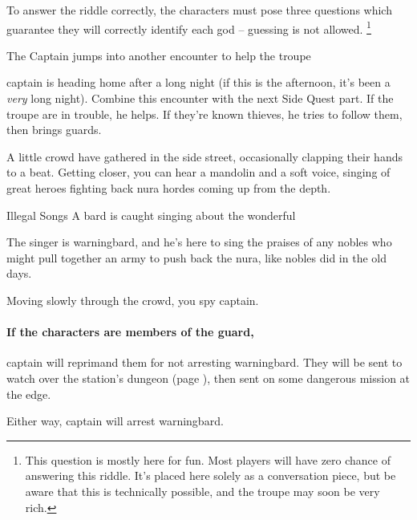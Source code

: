 To answer the riddle correctly, the characters must pose three questions which guarantee they will correctly identify each god -- guessing is not allowed.
\footnote{This question is mostly here for fun.  Most players will have zero chance of answering this riddle.
It's placed here solely as a conversation piece, but be aware that this is technically possible, and the troupe may soon be very rich.}

{\squash The Captain}%
{ jumps into another encounter to help the troupe}%

\Gls{captain} is heading home after a long night (if this is the afternoon, it's been a \emph{very} long night).
Combine this encounter with the next Side Quest part.
If the troupe are in trouble, he helps.
If they're known thieves, he tries to follow them, then brings guards.

\captain

\begin{boxtext}
  A little crowd have gathered in the side street, occasionally clapping their hands to a beat.
  Getting closer, you can hear a mandolin and a soft voice, singing of great heroes fighting back nura hordes coming up from the depth.
\end{boxtext}

{Illegal Songs}%
{A bard is caught singing about the wonderful }%

The singer is \gls{warningbard}, and he's here to sing the praises of any nobles who might pull together an army to push back the nura, like nobles did in the old days.

\begin{boxtext}

  Moving slowly through the crowd, you spy \gls{captain}.

\end{boxtext}

\paragraph{If the characters are members of the \gls{guard},}
\gls{captain} will reprimand them for not arresting \gls{warningbard}.
They will be sent to watch over the station's dungeon (page \pageref{stationDungeon}), then sent on some dangerous mission at the \gls{edge}.

Either way, \gls{captain} will arrest \gls{warningbard}.

